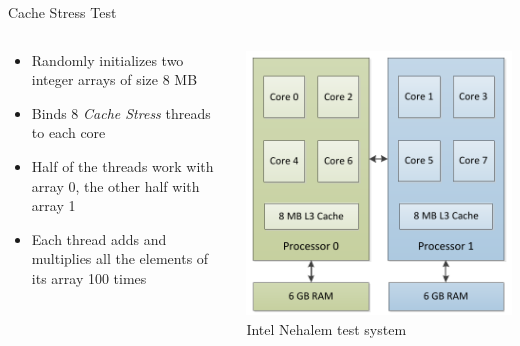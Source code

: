 \begin{frame}{Cache Stress Test}
  \begin{columns}[c]
    \begin{column}{0.47\textwidth}
      \begin{itemize}
      \item Randomly initializes two integer arrays of size 8 MB
      \item Binds 8 \emph{Cache Stress} threads to each core
      \item Half of the threads work with array 0, the other half with
        array 1
      \item Each thread adds and multiplies all the elements of its
        array 100 times
      \end{itemize}
    \end{column}
    \begin{column}{0.53\textwidth}
      \begin{center}
        \includegraphics[width=\textwidth]{figures/mafushi} \\
        \tiny{Intel Nehalem test system}
      \end{center}
    \end{column}
  \end{columns}
\end{frame}

